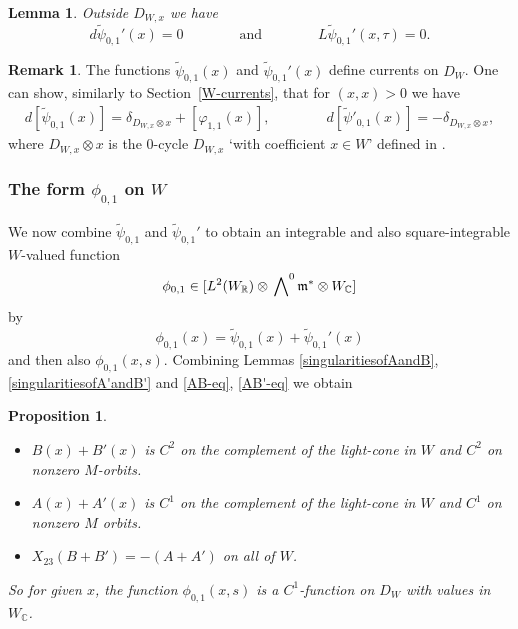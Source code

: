 \documentclass[12pt,leqno]{amsart}
\numberwithin{equation}{section}
\theoremstyle{plain}
\newtheorem{lemma}[theorem]{Lemma}
\newtheorem{proposition}[theorem]{Proposition}
\theoremstyle{definition}
\newtheorem{remark}[theorem]{Remark}
\theoremstyle{remark}
\newcommand{\R}{\mathbb{R}}
\newcommand{\C}{\mathbb{C}}
\newcommand{\wwedge}[1]{\sideset{}{^{#1}}\bigwedge}
\begin{document}
\begin{lemma}\label{xi'closed}
Outside $D_{W,x}$ we have
 \[
d \tilde{\psi}_{0,1}'(x) = 0 \qquad \qquad \text{and} \qquad \qquad 
L \tilde{\psi}_{0,1}'(x,\tau) = 0.
\]
\end{lemma}






\begin{remark}
The functions $\tilde{\psi}_{0,1}(x)$ and $\tilde{\psi}_{0,1}'(x)$ define currents on $D_W$. One can show, similarly to Section~\ref{W-currents}, that for $(x,x)>0$ we have
\begin{align*}
d[\tilde{\psi}_{0,1}(x)] = \delta_{D_{W,x} \otimes x} + [\varphi_{1,1}(x)], \qquad \qquad 
d[\tilde{\psi}'_{0,1}(x)] = -\delta_{D_{W,x} \otimes x},
\end{align*}
where $D_{W,x} \otimes x$ is the $0$-cycle $D_{W,x}$ `with coefficient $x \in W$' defined in \cite{FMcoeff}. 
\end{remark}




\subsubsection{The form $\phi_{0,1}$ on $W$}




We now combine $\tilde{\psi}_{0,1}$ and $\tilde{\psi}_{0,1}'$ to obtain an integrable and also square-integrable $W$-valued function 
\[
\phi_{0,1}  \in [L^2(W_{\R}) \otimes \wwedge{0} \mathfrak{m}^{\ast} \otimes W_{\C}]
\]
by
\begin{equation*}
\phi_{0,1}(x) = \tilde{\psi}_{0,1}(x) + \tilde{\psi}_{0,1}'(x)
\end{equation*}
and then also $\phi_{0,1}(x,s)$. Combining Lemmas \ref{singularitiesofAandB}, \ref{singularitiesofA'andB'} and \eqref{AB-eq}, \eqref{AB'-eq} we obtain

\begin{proposition}\label{phi-prop}
\begin{itemize}
\item[(i)] $B(x) + B'(x)$ is $C^2$ on the complement of the light-cone in $W$ and  $C^2$ on nonzero $M$-orbits.
\item[(ii)] $A(x) + A'(x)$ is $C^1$ on the complement of the light-cone in $W$ and  $C^1$ on nonzero $M$ orbits.
\item[(iii)] $X_{23}(B + B') = -(A + A')$ on all of $W$.
\end{itemize}
So for given $x$, the function $\phi_{0,1}(x,s)$ is a $C^1$-function on $D_W$ with values in $W_{\C}$.
\end{proposition}
\end{document}
